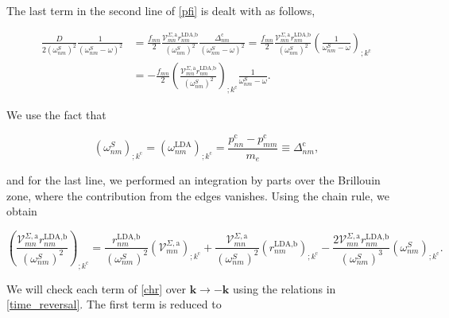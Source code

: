 \documentclass[10pt]{article}
\begin{document}
The last term in the second line of \eqref{pfi} is dealt with as follows,

\begin{align}\label{dresn}
\frac{D}{2(\omega^S_{nm})^2}\frac{1}{(\omega^S_{nm}-\omega)^2} 
&= \frac{f_{mn}}{2}\frac{\mathcal{V}^{\Sigma,\text{a}}_{mn}r^{\text{LDA,b}}_{nm}}{(\omega^S_{nm})^2}\frac{\Delta^{\text{c}}_{nm}}{(\omega^S_{nm}-\omega)^2} = \frac{f_{mn}}{2}\frac{\mathcal{V}^{\Sigma,\text{a}}_{mn}r^{\text{LDA,b}}_{nm}}{(\omega^S_{nm})^2}\left(\frac{1}{\omega^S_{nm}-\omega}\right)_{;k^{\text{c}}}\nonumber\\
&= -\frac{f_{mn}}{2}\left(\frac{\mathcal{V}^{\Sigma,\text{a}}_{mn}r^{\text{LDA,b}}_{nm}}{(\omega^S_{nm})^2}\right)_{;k^{\text{c}}}\frac{1}{\omega^S_{nm}-\omega}.
\end{align} 

We use the fact that

\begin{equation}\label{wk}
(\omega^S_{nm})_{;k^{\text{c}}}=(\omega^\text{LDA}_{nm})_{;k^{\text{c}}} = \frac{p_{nn}^{\text{c}}-p_{mm}^{\text{c}}}{m_{e}} \equiv \Delta_{nm}^{\text{c}},
\end{equation}

and for the last line, we performed an integration by parts over the Brillouin zone, where the contribution from the edges vanishes. Using the chain rule, we obtain

\begin{equation}\label{chr}
\left(\frac{\mathcal{V}^{\Sigma,\text{a}}_{mn}r^{\text{LDA,b}}_{nm}}{(\omega^{S}_{nm})^2}\right)_{;k^{\text{c}}} = \frac{r^{\text{LDA,b}}_{nm}}{(\omega^{S}_{nm})^2}\left(\mathcal{V} ^{\Sigma,\text{a}}_{mn}\right)_{;k^{\text{c}}} + \frac{\mathcal{V}^{\Sigma,\text{a}}_{mn}}{(\omega^{S}_{nm})^2}\left(r^{\text{LDA,b}}_{nm}\right)_{;k^{\text{c}}} - \frac{2\mathcal{V}^{\Sigma,\text{a}}_{mn}r^{\text{LDA,b}}_{nm}}{(\omega^{S}_{nm})^3}\left(
\omega^{S}_{nm}\right)_{;k^{\text{c}}}.
\end{equation}

We will check each term of \eqref{chr} over $\mathbf{k} \rightarrow - \mathbf{k}$ using the relations in \eqref{time_reversal}. The first term is reduced to
\end{document}
